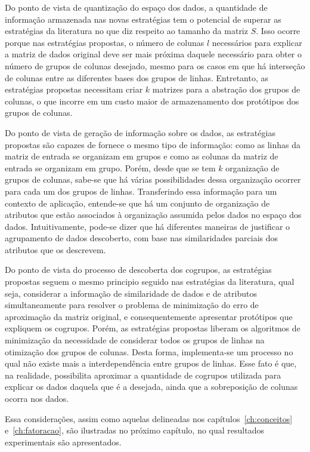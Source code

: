 \documentclass[
    12pt,                %
    oneside,            %
    a4paper,            %
    english,            %
    brazil                %
    ]{abntex2ppgsi}
\begin{document}
Do ponto de vista de quantização do espaço dos dados, a quantidade de informação armazenada nas novas estratégias tem o potencial de superar as estratégias da literatura no que diz respeito ao tamanho da matriz $S$. Isso ocorre porque nas estratégias propostas, o número de colunas $l$ necessários para explicar a matriz de dados original deve ser mais próxima daquele necessário para obter o número de grupos de colunas desejado, mesmo para os casos em que há interseção de colunas entre as diferentes bases dos grupos de linhas. Entretanto, as estratégias propostas necessitam criar $k$ matrizes para a abstração dos grupos de colunas, o que incorre em um custo maior de armazenamento dos protótipos dos grupos de colunas.

Do ponto de vista de geração de informação sobre os dados, as estratégias propostas são capazes de fornece o mesmo tipo de informação: como as linhas da matriz de entrada se organizam em grupos e como as colunas da matriz de entrada se organizam em grupo. Porém, desde que se tem $k$ organização de grupos de colunas, sabe-se que há várias possibilidades dessa organização ocorrer para cada um dos grupos de linhas. Transferindo essa informação para um contexto de aplicação, entende-se que há um conjunto de organização de atributos que estão associados à organização assumida pelos dados no espaço dos dados. Intuitivamente, pode-se dizer que há diferentes maneiras de justificar o agrupamento de dados descoberto, com base nas similaridades parciais dos atributos que os descrevem.

Do ponto de vista do processo de descoberta dos cogrupos, as estratégias propostas seguem o mesmo principio seguido nas estratégias da literatura, qual seja, considerar a informação de similaridade de dados e de atributos simultaneamente para resolver o problema de minimização do erro de aproximação da matriz original, e consequentemente apresentar protótipos que expliquem os cogrupos. Porém, as estratégias propostas liberam os algoritmos de minimização da necessidade de considerar todos os grupos de linhas na otimização dos grupos de colunas. Desta forma, implementa-se um processo no qual não existe mais a interdependência entre grupos de linhas. Esse fato é que, na realidade, possibilita aproximar a quantidade de cogrupos utilizada para explicar os dados daquela que é a desejada, ainda que a sobreposição de colunas ocorra nos dados.

Essa considerações, assim como aquelas delineadas nos capítulos~\ref{ch:conceitos} e~\ref{ch:fatoracao}, são ilustradas no próximo capítulo, no qual resultados experimentais são apresentados.
\end{document}
